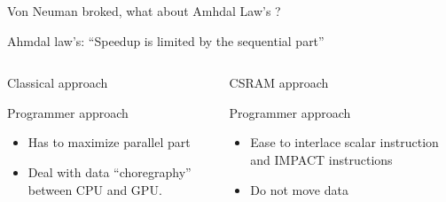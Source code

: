 %
\begin{Frame}{Von Neuman broked, what about Amhdal Law's ?}
  \begin{alertblock}{Ahmdal law's:   ``Speedup is limited by the sequential part''}
  \end{alertblock}
  \begin{columns}[t]
    \begin{column}{\BW} %
      \begin{block}{Classical approach}
      \end{block}   

      \begin{block}{Programmer approach}
        \begin{itemize}
        \item Has to maximize parallel part
        \item Deal with data ``choregraphy'' between CPU and GPU.
        \end{itemize}
      \end{block}

    \end{column}
    \begin{column}{\BW} %
      \begin{block}{CSRAM approach}
      \end{block}   
      \begin{block}{Programmer approach}
        \begin{itemize}
        \item Ease to interlace scalar instruction and IMPACT instructions
        \item Do not move data
        \end{itemize}
      \end{block}
    \end{column}
  \end{columns}  
\end{Frame}


